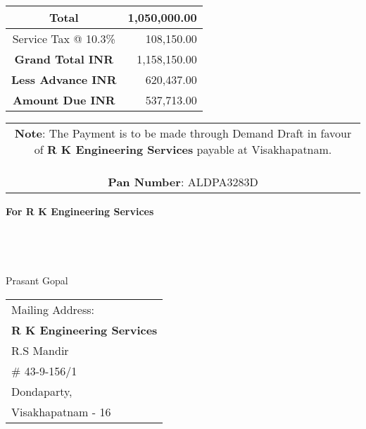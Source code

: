 \documentclass[11pt]{article}
\begin{document}

\hspace*{11.45cm}
\begin{tabular}{|c|r|}
\hline
Total & 1,050,000.00 \\
\hline
Service Tax @ 10.3\% & 108,150.00 \\
\hline
{\bf Grand Total INR} & 1,158,150.00 \\ 
\hline
{\bf Less Advance INR} & 620,437.00 \\
\hline
{\bf Amount Due INR} & 537,713.00 \\
\hline
\end{tabular}

\vspace*{-2cm}
\noindent \begin{tabular}{c}
\parbox{4in}{\small {\bf Note}: The Payment is to be made through Demand Draft in favour of {\bf R K Engineering Services} payable at Visakhapatnam. \\ \ \\
{\noindent \bf Pan Number}:  ALDPA3283D }\\
\end{tabular}
\vspace*{90pt}


{\bf For  R K Engineering Services } \\ \\ \\ \\ \\
 \hspace*{0.6cm}Prasant Gopal
\vspace*{-85pt}
\begin{flushright}
\begin{tabular}{l}
Mailing Address:\\
{\bf R K Engineering Services}\\
R.S Mandir\\
\# 43-9-156/1\\
Dondaparty, \\ 
Visakhapatnam - 16\\
\end{tabular}
\end{flushright}
\end{document}
